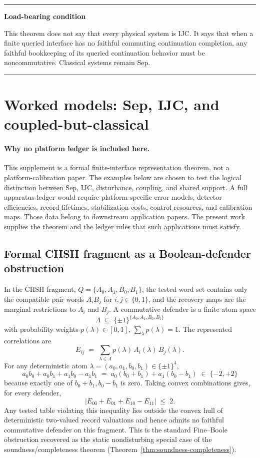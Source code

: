 \documentclass[11pt]{article}
\newenvironment{warningbox}{\par\medskip\hrule\vspace{0.4em}\textbf{Load-bearing condition}\par\vspace{0.3em}}{\vspace{0.5em}\hrule\par\medskip}
\begin{document}
\begin{warningbox}
This theorem does not say that every physical system is IJC.  It says that when a finite queried interface has no faithful commuting continuation completion, any faithful bookkeeping of its queried continuation behavior must be noncommutative.  Classical systems remain Sep.
\end{warningbox}

\section{Worked models: Sep, IJC, and coupled-but-classical}\label{sec:worked-models}

\paragraph{Why no platform ledger is included here.}
This supplement is a formal finite-interface representation theorem,
not a platform-calibration paper.  The examples below are chosen to
test the logical distinction between Sep, IJC, disturbance, coupling,
and shared support.  A full apparatus ledger would require
platform-specific error models, detector efficiencies, record
lifetimes, stabilization costs, control resources, and calibration
maps.  Those data belong to downstream application papers.  The
present work supplies the theorem and the ledger rules that such
applications must satisfy.

\subsection{Formal CHSH fragment as a Boolean-defender obstruction}\label{subsec:formal-chsh-fragment}

In the CHSH fragment, $Q=\{A_0,A_1,B_0,B_1\}$, the tested word set
contains only the compatible pair words $A_iB_j$ for $i,j\in\{0,1\}$,
and the recovery maps are the marginal restrictions to $A_i$ and
$B_j$.  A commutative defender is a finite atom space
\[
    \Lambda \;\subseteq\; \{\pm 1\}^{\{A_0,A_1,B_0,B_1\}}
\]
with probability weights $p(\lambda)\in[0,1]$,
$\sum_\lambda p(\lambda)=1$.  The represented correlations are
\[
    E_{ij}
    \;=\;
    \sum_{\lambda\in\Lambda}p(\lambda)\,A_i(\lambda)\,B_j(\lambda).
\]
For any deterministic atom
$\lambda=(a_0,a_1,b_0,b_1)\in\{\pm 1\}^4$,
\[
    a_0 b_0 + a_0 b_1 + a_1 b_0 - a_1 b_1
    \;=\;
    a_0(b_0+b_1) + a_1(b_0 - b_1)
    \;\in\;
    \{-2,+2\}
\]
because exactly one of $b_0+b_1, b_0-b_1$ is zero.  Taking convex
combinations gives, for every defender,
\[
    \bigl|E_{00}+E_{01}+E_{10}-E_{11}\bigr| \;\le\; 2.
\]
Any tested table violating this inequality lies outside the convex
hull of deterministic two-valued record valuations and hence admits
no faithful commutative defender on this fragment.  This is the
standard Fine--Boole obstruction recovered as the static
nondisturbing special case of the soundness/completeness theorem
(Theorem~\ref{thm:soundness-completeness}).
\end{document}
